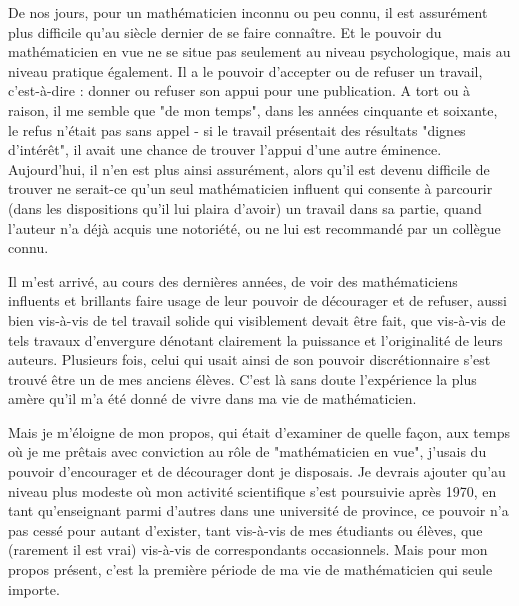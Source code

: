De nos jours, pour un mathématicien inconnu ou peu connu, il est assurément plus difficile qu'au siècle dernier de se faire connaître. Et le pouvoir du mathématicien en vue ne se situe pas seulement au niveau psychologique, mais au niveau pratique également. Il a le pouvoir d'accepter ou de refuser un travail, c'est-à-dire : donner ou refuser son appui pour une publication. A tort ou à raison, il me semble que "de mon temps", dans les années cinquante et soixante, le refus n'était pas sans appel - si le travail présentait des résultats "dignes d'intérêt", il avait une chance de trouver l'appui d'une autre éminence. Aujourd'hui, il n'en est plus ainsi assurément, alors qu'il est devenu difficile de trouver ne serait-ce qu'un seul mathématicien influent qui consente à parcourir (dans les dispositions qu'il lui plaira d'avoir) un travail dans sa partie, quand l'auteur n'a déjà acquis une notoriété, ou ne lui est recommandé par un collègue connu.

Il m'est arrivé, au cours des dernières années, de voir des mathématiciens influents et brillants faire usage de leur pouvoir de décourager et de refuser, aussi bien vis-à-vis de tel travail solide qui visiblement devait être fait, que vis-à-vis de tels travaux d'envergure dénotant clairement la puissance et l'originalité de leurs auteurs. Plusieurs fois, celui qui usait ainsi de son pouvoir discrétionnaire s'est trouvé être un de mes anciens élèves. C'est là sans doute l'expérience la plus amère qu'il m'a été donné de vivre dans ma vie de mathématicien.

Mais je m'éloigne de mon propos, qui était d'examiner de quelle façon, aux temps où je me prêtais avec conviction au rôle de "mathématicien en vue", j'usais du pouvoir d'encourager et de décourager dont je disposais. Je devrais ajouter qu'au niveau plus modeste où mon activité scientifique s'est poursuivie après 1970, en tant qu'enseignant parmi d'autres dans une université de province, ce pouvoir n'a pas cessé pour autant d'exister, tant vis-à-vis de mes étudiants ou élèves, que (rarement il est vrai) vis-à-vis de correspondants occasionnels. Mais pour mon propos présent, c'est la première période de ma vie de mathématicien qui seule importe.

